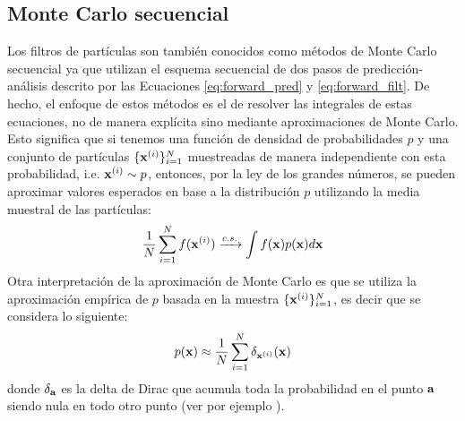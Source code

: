 \subsection{Monte Carlo secuencial}


Los filtros de partículas son también conocidos como métodos de Monte Carlo secuencial ya que utilizan el esquema secuencial de dos pasos de predicción-análisis descrito por las Ecuaciones \ref{eq:forward_pred} y \ref{eq:forward_filt}. De hecho, el enfoque de estos métodos es el de resolver las integrales de estas ecuaciones, no de manera explícita sino mediante aproximaciones de Monte Carlo. Esto significa que si tenemos una función de densidad de probabilidades $p$ y una conjunto de partículas $\{\mathbf{x}^{(i)}\}_{i=1}^N$ muestreadas de manera independiente con esta probabilidad, i.e. $\mathbf{x}^{(i)}\sim p$, entonces, por la ley de los grandes números, se pueden aproximar valores esperados en base a la distribución $p$ utilizando la media muestral de las partículas:
\begin{align*}
    \frac{1}{N}\sum_{i=1}^N f(\mathbf{x}^{(i)}) \xrightarrow{c. s.} \int f(\mathbf{x}) p(\mathbf{x}) d \mathbf{x}
\end{align*}
Otra interpretación de la aproximación de Monte Carlo es que se utiliza la aproximación empírica de $p$ basada en la muestra $\{\mathbf{x}^{(i)}\}_{i=1}^N$, es decir que se considera lo siguiente:
\begin{align*}
    p(\mathbf{x}) \approx \frac{1}{N}\sum_{i=1}^N \delta_{\mathbf{x}^{(i)}}(\mathbf{x})
\end{align*}
donde $\delta_{\mathbf{a}}$ es la delta de Dirac que acumula toda la probabilidad en el punto $\mathbf{a}$ siendo nula en todo otro punto (ver por ejemplo \cite{Doucet2001}).

